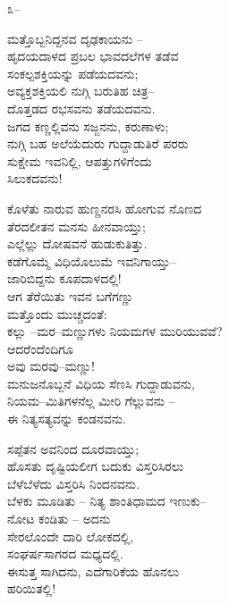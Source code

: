 \begin{center}
೩–
\end{center}

\begin{myquote}
ಮತ್ತೊಬ್ಬನಿದ್ದನವ ದೃಢಕಾಯನು –\\ಹೃದಯದಾಳದ ಪ್ರಬಲ ಭಾವದಲೆಗಳ ತಡೆವ\\ಸಂಕಲ್ಪಶಕ್ತಿಯನ್ನು ಪಡೆಯದವನು;\\ಅವ್ಯಕ್ತಶಕ್ತಿಯಲಿ ನುಗ್ಗಿ ಬರುತಿಹ ಚಿತ್ರ–\\ದೊತ್ತಡದ ರಭಸವನು ತಡೆಯದವನು.\\ಜಗದ ಕಣ್ಣಲ್ಲಿವನು ಸಜ್ಜನನು, ಕರುಣಾಳು;\\ನುಗ್ಗಿ ಬಹ ಅಲೆಯೆದುರು ಗುದ್ದಾಡುತಿರೆ ಪರರು\\ಸುಕ್ಷೇಮ ಇವನಿಲ್ಲಿ, ಆಪತ್ತುಗಳಿಗೆಂದು\\ಸಿಲುಕದವನು!
\end{myquote}

\begin{myquote}
ಕೊಳೆತು ನಾರುವ ಹುಣ್ಣನರಸಿ ಹೋಗುವ ನೊಣದ\\ತೆರದಲೀತನ ಮನಸು ಹೀನವಾಯ್ತು;\\ಎಲ್ಲೆಲ್ಲು ದೋಷವನೆ ಹುಡುಕುತಿತ್ತು.\\ಕಡೆಗೊಮ್ಮೆ ವಿಧಿಯೊಲುಮೆ ಇವನಿಗಾಯ್ತು–\\ಜಾರಿಬಿದ್ದನು ಕೂಪದಾಳದಲ್ಲಿ!\\ಆಗ ತೆರೆಯಿತು ಇವನ ಬಗೆಗಣ್ಣು\\ಮತ್ತೊಂದು ಮುಚ್ಚದಂತೆ:\\ಕಲ್ಲು –ಮರ–ಮಣ್ಣುಗಳು ನಿಯಮಗಳ ಮುರಿಯುವವೆ?\\ಆದರೆಂದೆಂದಿಗೂ\\ಅವು ಮರವು–ಮಣ್ಣು!\\ಮನುಜನೊಬ್ಬನೆ ವಿಧಿಯ ಸೆಣಸಿ ಗುದ್ದಾಡುವನು,\\ನಿಯಮ–ಮಿತಿಗಳನೆಲ್ಲ ಮೀರಿ ಗೆಲ್ಲುವನು –\\ಈ ನಿತ್ಯಸತ್ಯವನ್ನು ಕಂಡನವನು.
\end{myquote}

\begin{myquote}
ಸಪ್ಪೆತನ ಅವನಿಂದ ದೂರವಾಯ್ತು;\\ಹೊಸತು ದೃಷ್ಟಿಯಲೀಗ ಬದುಕು ವಿಸ್ತರಿಸಿರಲು\\ಬೆಳೆಬೆಳೆದು ವಿಸ್ತರಿಸಿ ನಿಂದನವನು.\\ಬೆಳಕು ಮೂಡಿತು – ನಿತ್ಯ ಶಾಂತಿಧಾಮದ ಇಣುಕು–\\ನೋಟ ಕಂಡಿತು – ಅದನು\\ಸೇರಲೊಂದೇ ದಾರಿ ಲೋಕದಲ್ಲಿ,\\ಸಂಘರ್ಷಸಾಗರದ ಮಧ್ಯದಲ್ಲಿ.\\ಈಸುತ್ತ ಸಾಗಿದನು, ಎದೆಗಾರಿಕೆಯ ಹೊನಲು\\ಹರಿಯಿತಲ್ಲಿ!
\end{myquote}

